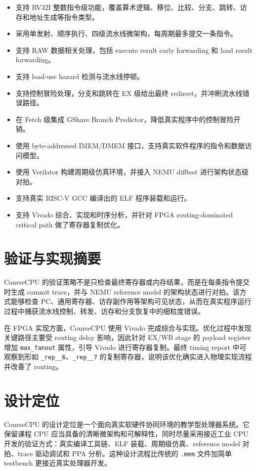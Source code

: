 \documentclass[UTF8,a4paper,12pt]{ctexrep}
\begin{document}
\begin{itemize}
  \item 支持 RV32I 整数指令级功能，覆盖算术逻辑、移位、比较、分支、跳转、访存和地址生成等指令类型。
  \item 采用单发射、顺序执行、四级流水线微架构，每周期最多提交一条指令。
  \item 支持 RAW 数据相关处理，包括 execute result early forwarding 和 load result forwarding。
  \item 支持 load-use hazard 检测与流水线停顿。
  \item 支持控制冒险处理，分支和跳转在 EX 级给出最终 redirect，并冲刷流水线错误路径。
  \item 在 Fetch 级集成 GShare Branch Predictor，降低真实程序中的控制冒险开销。
  \item 使用 byte-addressed IMEM/DMEM 接口，支持真实软件程序的指令和数据访问模型。
  \item 使用 Verilator 构建周期级仿真环境，并接入 NEMU difftest 进行架构状态级对拍。
  \item 支持真实 RISC-V GCC 编译出的 ELF 程序装载和运行。
  \item 支持 Vivado 综合、实现和时序分析，并针对 FPGA routing-dominated critical path 做了寄存器复制优化。
\end{itemize}

\section{验证与实现摘要}

CourseCPU 的验证策略不是只检查最终寄存器或内存结果，而是在每条指令提交时生成 commit trace，并与 NEMU reference model 的架构状态进行对拍。该方式能够检查 PC、通用寄存器、访存副作用等架构可见状态，从而在真实程序运行过程中捕获流水线控制、转发、访存和分支恢复中的细粒度错误。

在 FPGA 实现方面，CourseCPU 使用 Vivado 完成综合与实现。优化过程中发现关键路径主要受 routing delay 影响，因此针对 EX/WB stage 的 payload register 增加 \texttt{max\_fanout} 属性，引导 Vivado 进行寄存器复制。最终 timing report 中可观察到形如 \texttt{\_rep\_\_6}、\texttt{\_rep\_\_7} 的复制寄存器，说明该优化确实进入物理实现流程并改善了 routing。

\section{设计定位}

CourseCPU 的设计定位是一个面向真实软硬件协同环境的教学型处理器系统。它保留课程 CPU 应当具备的清晰微架构和可解释性，同时尽量采用接近工业 CPU 开发的验证方式：真实编译工具链、ELF 装载、周期级仿真、reference model 对拍、trace 驱动调试和 PPA 分析。这种设计流程比传统的 \texttt{.mem} 文件加简单 testbench 更接近真实处理器开发。
\end{document}
